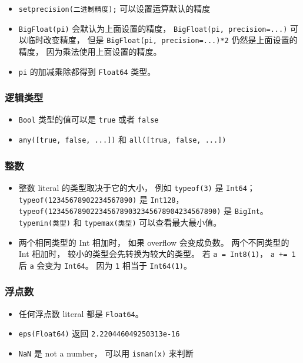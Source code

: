 \begin{itemize}
\item \verb|setprecision(二进制精度);| 可以设置运算默认的精度
\item \verb|BigFloat(pi)| 会默认为上面设置的精度， \verb|BigFloat(pi, precision=...)| 可以临时改变精度， 但是 \verb|BigFloat(pi, precision=...)*2| 仍然是上面设置的精度， 因为乘法使用上面设置的精度。
\item \verb|pi| 的加减乘除都得到 \verb|Float64| 类型。
\end{itemize}


\subsubsection{逻辑类型}
\begin{itemize}
\item \verb|Bool| 类型的值可以是 \verb|true| 或者 \verb|false|
\item \verb|any([true, false, ...])| 和 \verb|all([trua, false, ...])|
\end{itemize}

\subsubsection{整数}
\begin{itemize}
\item 整数 literal 的类型取决于它的大小， 例如 \verb|typeof(3)| 是 \verb|Int64|； \verb|typeof(12345678902234567890)| 是 \verb|Int128|， \verb|typeof(1234567890223456789032345678904234567890)| 是 \verb|BigInt|。 \verb|typemin(类型)| 和 \verb|typemax(类型)| 可以查看最大最小值。
\item 两个相同类型的 Int 相加时， 如果 overflow 会变成负数。 两个不同类型的 Int 相加时， 较小的类型会先转换为较大的类型。 若 \verb|a = Int8(1)|， \verb|a += 1| 后 \verb|a| 会变为 \verb|Int64|。 因为 \verb|1| 相当于 \verb|Int64(1)|。
\end{itemize}

\subsubsection{浮点数}
\begin{itemize}
\item 任何浮点数 literal 都是 \verb|Float64|。
\item \verb|eps(Float64)| 返回 \verb|2.220446049250313e-16|
\item \verb|NaN| 是 not a number， 可以用 \verb|isnan(x)| 来判断
\end{itemize}

